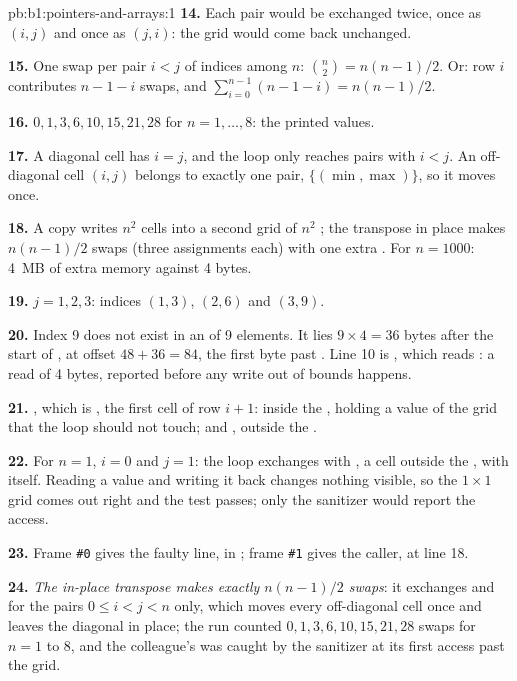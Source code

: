 \begin{solution}{pb:b1:pointers-and-arrays:1}
\textbf{14.} Each pair would be exchanged twice, once as $(i, j)$ and once as $(j, i)$: the grid would come back
unchanged.

\textbf{15.} One swap per pair $i < j$ of indices among $n$: $\binom{n}{2} = n(n-1)/2$. Or: row $i$ contributes
$n - 1 - i$ swaps, and $\sum_{i=0}^{n-1} (n - 1 - i) = n(n-1)/2$.

\textbf{16.} $0, 1, 3, 6, 10, 15, 21, 28$ for $n = 1, \dots, 8$: the printed values.

\textbf{17.} A diagonal cell has $i = j$, and the loop only reaches pairs with $i < j$. An off-diagonal cell $(i, j)$
belongs to exactly one pair, $\{(\min, \max)\}$, so it moves once.

\textbf{18.} A copy writes $n^2$ cells into a second grid of $n^2$ ; the transpose in place makes $n(n-1)/2$
swaps (three assignments each) with one extra . For $n = 1000$: 4~MB of extra memory against 4 bytes.

\textbf{19.} $j = 1, 2, 3$: indices $(1, 3)$, $(2, 6)$ and $(3, 9)$.

\textbf{20.} Index 9 does not exist in an  of 9 elements. It lies $9 \times 4 = 36$ bytes after the start of
, at offset $48 + 36 = 84$, the first byte past . Line 10 is , which
reads : a read of 4 bytes, reported before any write out of bounds happens.

\textbf{21.} , which is , the first cell of row $i + 1$: inside the , holding a
value of the grid that the loop should not touch; and , outside the .

\textbf{22.} For $n = 1$, $i = 0$ and $j = 1$: the loop exchanges  with , a cell outside the ,
with itself. Reading a value and writing it back changes nothing visible, so the $1 \times 1$ grid comes out right and
the test passes; only the sanitizer would report the access.

\textbf{23.} Frame \texttt{\#0} gives the faulty line,  in ; frame \texttt{\#1}
gives the caller,  at line 18.

\textbf{24.} \emph{The in-place transpose makes exactly $n(n-1)/2$ swaps}: it exchanges  and
 for the pairs $0 \leq i < j < n$ only, which moves every off-diagonal cell once and leaves the
diagonal in place; the run counted $0, 1, 3, 6, 10, 15, 21, 28$ swaps for $n = 1$ to 8, and the colleague's
 was caught by the sanitizer at its first access past the grid.
\end{solution}
